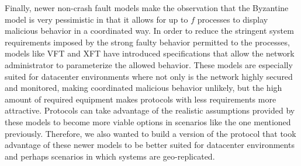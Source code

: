 Finally, newer non-crash fault models make the observation that the Byzantine model is very pessimistic in that it allows for up to $f$ processes to display malicious behavior in a coordinated way. In order to reduce the stringent system requirements imposed by the strong faulty behavior permitted to the processes, models like VFT and XFT have introduced specifications that allow the network administrator to parameterize the allowed behavior. These models are especially suited for datacenter environments where not only is the network highly secured and monitored, making coordinated malicious behavior unlikely, but the high amount of required equipment makes protocols with less requirements more attractive. Protocols can take advantage of the realistic assumptions provided by these models to become more viable options in scenarios like the one mentioned previously. Therefore, we also wanted to build a version of the protocol that took advantage of these newer models to be better suited for datacenter environments and perhaps scenarios in which systems are geo-replicated. \par

